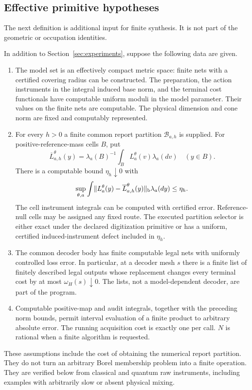 \subsection{Effective primitive hypotheses}
The next definition is additional input for finite synthesis. It is not part of the geometric or occupation identities.

\begin{definition}\label{def:effective}
In addition to Section~\ref{sec:experiments}, suppose the following data are given.
\begin{enumerate}[label=\textup{(E\arabic*)}]
\item The model set is an effectively compact metric space: finite nets with a certified covering radius can be constructed. The preparation, the action instruments in the integral induced base norm, and the terminal cost functionals have computable uniform moduli in the model parameter. Their values on the finite nets are computable. The physical dimension and cone norm are fixed and computably represented.
\item For every $h>0$ a finite common report partition $\mathcal B_{a,h}$ is supplied. For positive-reference-mass cells $B$, put
\[
 \overline L_{a,h}^\theta(y)=\lambda_a(B)^{-1}\int_B L_a^\theta(v)\lambda_a(dv)
 \quad(y\in B).
\]
There is a computable bound $\eta_h\downarrow0$ with
\begin{equation}\label{eq:report-approximation}
 \sup_{\theta,a}\int\lVert L_a^\theta(y)-\overline L_{a,h}^\theta(y)\rVert_{\mathrm b}\lambda_a(dy)
       \le\eta_h.
\end{equation}
The cell instrument integrals can be computed with certified error. Reference-null cells may be assigned any fixed route. The executed partition selector is either exact under the declared digitization primitive or has a uniform, certified induced-instrument defect included in $\eta_h$.
\item The common decoder body has finite computable legal nets with uniformly controlled loss error. In particular, at a decoder mesh $s$ there is a finite list of finitely described legal outputs whose replacement changes every terminal cost by at most $\omega_H(s)\downarrow0$. The lists, not a model-dependent decoder, are part of the program.
\item Computable positive-map and audit integrals, together with the preceding norm bounds, permit interval evaluation of a finite product to arbitrary absolute error. The running acquisition cost is exactly one per call. $N$ is rational when a finite algorithm is requested.
\end{enumerate}
\end{definition}
These assumptions include the cost of obtaining the numerical report partition. They do not turn an arbitrary Borel membership problem into a finite operation. They are verified below from classical and quantum raw instruments, including examples with arbitrarily slow or absent physical mixing.

